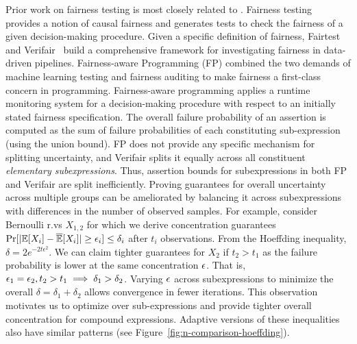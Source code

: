 Prior work on fairness testing is most closely related to \AVOIRmethodname{}.
Fairness testing~\citep{galhotra2017fairness} provides a notion of causal fairness and generates tests to check the fairness of a given decision-making procedure.
Given a specific definition of fairness, Fairtest~\citep{tramer2017fairtest} and Verifair~\citep{bastani2019probabilistic} build a comprehensive framework for investigating fairness in data-driven pipelines. 
Fairness-aware Programming (FP) \citep{albarghouthi2019fairness} combined the two demands of machine learning testing and fairness auditing to make fairness a first-class concern in programming. 
Fairness-aware programming applies a runtime monitoring system for a decision-making procedure with respect to an initially stated fairness specification.
The overall failure probability of an assertion is computed as the sum of failure probabilities of each constituting sub-expression (using the union bound).
FP does not provide any specific mechanism for splitting uncertainty, and Verifair splits it equally across all constituent \textit{elementary subexpressions}.
Thus, assertion bounds for subexpressions in both FP and Verifair are split inefficiently. 
Proving guarantees for overall uncertainty across multiple groups can be ameliorated by balancing it across subexpressions with differences in the number of observed samples.
For example, consider Bernoulli r.vs  $X_{1,2}$ for which we derive concentration guarantees $\Pr[|\mathbb{E}[X_i] - \overline{\mathbb{E}}[X_i]| \geq \epsilon_{i}] \leq \delta_{i}$ after $t_{i}$ observations. 
From the Hoeffding inequality, $\delta = 2e^{-2t\epsilon^2}$.
We can claim tighter guarantees for $X_2$ if $t_2 > t_1$ as the failure probability is lower at the same concentration ${\epsilon}$.
That is, ${\epsilon}_1 = {\epsilon}_2, t_2 > t_1 \implies \delta_1 > \delta_2$.
Varying ${\epsilon}$ across subexpressions to minimize the overall $\delta = \delta_1 + \delta_2$ allows convergence in fewer iterations.
This observation motivates us to optimize over sub-expressions and provide tighter overall concentration for compound expressions.
Adaptive versions of these inequalities also have similar patterns (see Figure~\ref{fig:n-comparison-hoeffding}).
